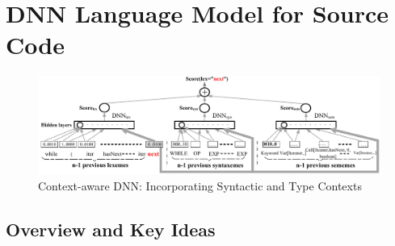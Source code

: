 \section{DNN Language Model for Source Code}
\label{dnnlmmodelsec}









\begin{figure}[t]
\centering
\includegraphics[width=6in]{contextmodel2.pdf} %
\vspace{0.03in}
\caption{Context-aware DNN: Incorporating Syntactic and Type Contexts}
\label{contextfig}
\end{figure}

\subsection{Overview and Key Ideas}
\label{keyideas}

